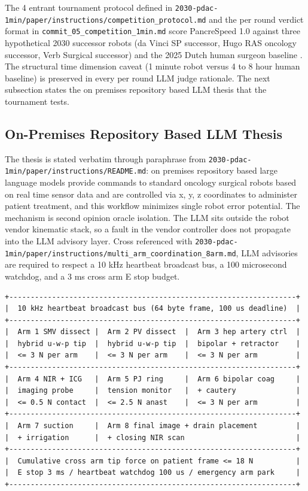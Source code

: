 The 4 entrant tournament protocol defined in
\texttt{2030-pdac-1min/paper/instructions/competition_protocol.md}
and the per round verdict format in
\texttt{commit_05_competition_1min.md} score PancreSpeed 1.0
against three hypothetical 2030 successor robots (da Vinci SP
successor, Hugo RAS oncology successor, Verb Surgical successor)
and the 2025 Dutch human surgeon baseline
\cite{DutchCohort2025Whipple}. The structural time dimension
caveat (1 minute robot versus 4 to 8 hour human baseline) is
preserved in every per round LLM judge rationale. The next
subsection states the on premises repository based LLM thesis
that the tournament tests.

\subsection{On-Premises Repository Based LLM Thesis}
\label{sec:intro-thesis}

The thesis is stated verbatim through paraphrase from
\texttt{2030-pdac-1min/paper/instructions/README.md}: on premises
repository based large language models provide commands to
standard oncology surgical robots based on real time sensor data
and are controlled via x, y, z coordinates to administer patient
treatment, and this workflow minimizes single robot error
potential. The mechanism is second opinion oracle isolation. The
LLM sits outside the robot vendor kinematic stack, so a fault in
the vendor controller does not propagate into the LLM advisory
layer. Cross referenced with
\texttt{2030-pdac-1min/paper/instructions/multi_arm_coordination_8arm.md},
LLM advisories are required to respect a 10 kHz heartbeat
broadcast bus, a 100 microsecond watchdog, and a 3 ms cross arm E
stop budget.

\begin{verbatim}
+-------------------------------------------------------------------+
|  10 kHz heartbeat broadcast bus (64 byte frame, 100 us deadline)  |
+-------------------------------------------------------------------+
|  Arm 1 SMV dissect |  Arm 2 PV dissect  |  Arm 3 hep artery ctrl  |
|  hybrid u-w-p tip  |  hybrid u-w-p tip  |  bipolar + retractor    |
|  <= 3 N per arm    |  <= 3 N per arm    |  <= 3 N per arm         |
+-------------------------------------------------------------------+
|  Arm 4 NIR + ICG   |  Arm 5 PJ ring     |  Arm 6 bipolar coag     |
|  imaging probe     |  tension monitor   |  + cautery              |
|  <= 0.5 N contact  |  <= 2.5 N anast    |  <= 3 N per arm         |
+-------------------------------------------------------------------+
|  Arm 7 suction     |  Arm 8 final image + drain placement         |
|  + irrigation      |  + closing NIR scan                          |
+-------------------------------------------------------------------+
|  Cumulative cross arm tip force on patient frame <= 18 N          |
|  E stop 3 ms / heartbeat watchdog 100 us / emergency arm park     |
+-------------------------------------------------------------------+
\end{verbatim}

